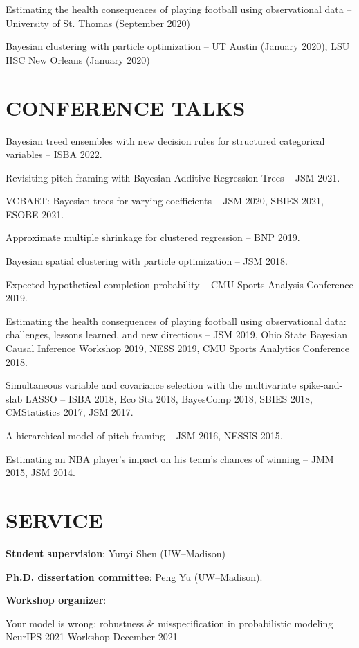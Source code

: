 \documentclass[margin]{res}
\begin{document}
\begin{resume}
Estimating the health consequences of playing football using observational data -- University of St. Thomas (September 2020)

Bayesian clustering with particle optimization -- UT Austin (January 2020), LSU HSC New Orleans (January 2020)

\section{CONFERENCE \hspace{0.1in} TALKS}

Bayesian treed ensembles with new decision rules for structured categorical variables -- ISBA 2022.

Revisiting pitch framing with Bayesian Additive Regression Trees -- JSM 2021.

VCBART: Bayesian trees for varying coefficients -- JSM 2020, SBIES 2021, ESOBE 2021.

Approximate multiple shrinkage for clustered regression -- BNP 2019.

Bayesian spatial clustering with particle optimization -- JSM 2018. 

Expected hypothetical completion probability -- CMU Sports Analysis Conference 2019.

Estimating the health consequences of playing football using observational data: challenges, lessons learned, and new directions -- JSM 2019, Ohio State Bayesian Causal Inference Workshop 2019, NESS 2019, CMU Sports Analytics Conference 2018.

Simultaneous variable and covariance selection with the multivariate spike-and-slab LASSO -- ISBA 2018, Eco Sta 2018, BayesComp 2018, SBIES 2018, CMStatistics 2017, JSM 2017.

A hierarchical model of pitch framing -- JSM 2016, NESSIS 2015.

Estimating an NBA player's impact on his team's chances of winning -- JMM 2015, JSM 2014.

\section{SERVICE}

\textbf{Student supervision}: Yunyi Shen (UW--Madison)

\textbf{Ph.D. dissertation committee}: Peng Yu (UW--Madison).

\textbf{Workshop organizer}: 

Your model is wrong: robustness \& misspecification in probabilistic modeling \\
NeurIPS 2021 Workshop \hfill December 2021


\end{resume}
\end{document}
